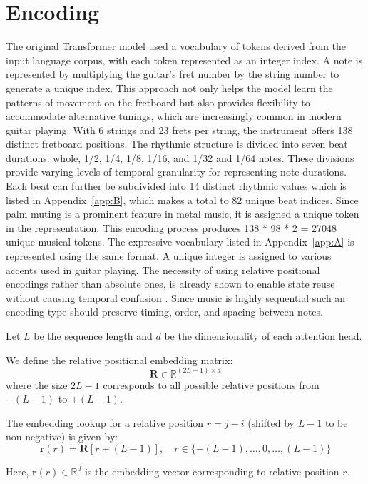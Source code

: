 \documentclass[twoside,11pt]{article}
\begin{document}
\section{Encoding}
The original Transformer model \cite{Vaswani} used a vocabulary of tokens derived from the input language corpus, with each token 
represented as an integer index. A note is represented by multiplying the guitar’s fret number by the string number to 
generate a unique index. This approach not only helps the model learn the patterns of movement on the fretboard 
but also provides flexibility to accommodate alternative tunings, which are increasingly common in modern guitar playing.
With 6 strings and 23 frets per string, the instrument offers 138 distinct fretboard positions. The rhythmic structure is 
divided into seven beat durations: whole, 1/2, 1/4, 1/8, 1/16, and 1/32 and 1/64 notes. 
These divisions provide varying levels of temporal granularity for representing note durations. Each beat can further be 
subdivided into 14 distinct rhythmic values which is listed in Appendix~\ref{app:B}, which makes a total to 82 unique beat indices.
Since palm muting is a prominent feature in metal music, 
it is assigned a unique token in the representation. This encoding process produces 138 * 98 * 2 = 27048 unique musical tokens. 
The expressive vocabulary listed in Appendix~\ref{app:A} is represented using the same format. A unique integer is assigned to various accents used in guitar playing.
The necessity of using relative positional encodings rather than absolute ones, is already shown to enable state reuse without causing temporal confusion \cite{XL}. 
Since music is highly sequential such an encoding type should preserve timing, order, and spacing between notes.

Let \( L \) be the sequence length and \( d \) be the dimensionality of each attention head.

We define the relative positional embedding matrix:
\[
\mathbf{R} \in \mathbb{R}^{(2L - 1) \times d}
\]
where the size \(2L - 1\) corresponds to all possible relative positions from \(- (L - 1)\) to \(+(L - 1)\).

The embedding lookup for a relative position \(r = j - i\) (shifted by \(L - 1\) to be non-negative) is given by:
\[
\mathbf{r}(r) = \mathbf{R}[r + (L - 1)], \quad r \in \{-(L-1), \ldots, 0, \ldots, (L-1)\}
\]

Here, \(\mathbf{r}(r) \in \mathbb{R}^d\) is the embedding vector corresponding to relative position \(r\).
\end{document}
